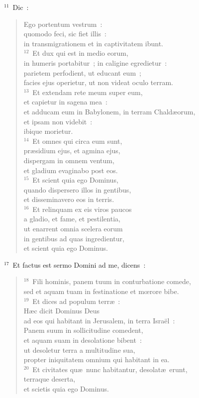 ${}^{11}$~Dic~: \begin{verse}Ego portentum vestrum~:\\ quomodo feci, sic fiet illis~:\\ in transmigrationem et in captivitatem ibunt.\\
${}^{12}$~Et dux qui est in medio eorum,\\ in humeris portabitur~; in caligine egredietur~:\\ parietem perfodient, ut educant eum~;\\ facies ejus operietur, ut non videat oculo terram.\\
${}^{13}$~Et extendam rete meum super eum,\\ et capietur in sagena mea~:\\ et adducam eum in Babylonem, in terram Chald\ae orum,\\ et ipsam non videbit~:\\ ibique morietur.\\
${}^{14}$~Et omnes qui circa eum sunt,\\ pr\ae sidium ejus, et agmina ejus,\\ dispergam in omnem ventum,\\ et gladium evaginabo post eos.\\
${}^{15}$~Et scient quia ego Dominus,\\ quando dispersero illos in gentibus,\\ et disseminavero eos in terris.\\
${}^{16}$~Et relinquam ex eis viros paucos\\ a gladio, et fame, et pestilentia,\\ ut enarrent omnia scelera eorum\\ in gentibus ad quas ingredientur,\\ et scient quia ego Dominus.\end{verse}


${}^{17}$~Et factus est sermo Domini ad me, dicens~:
\begin{verse}${}^{18}$~Fili hominis, panem tuum in conturbatione comede,\\ sed et aquam tuam in festinatione et mœrore bibe.\\
${}^{19}$~Et dices ad populum terr\ae~:\\ H\ae c dicit Dominus Deus\\ ad eos qui habitant in Jerusalem, in terra Isra\"el~:\\ Panem suum in sollicitudine comedent,\\ et aquam suam in desolatione bibent~:\\ ut desoletur terra a multitudine sua,\\ propter iniquitatem omnium qui habitant in ea.\\
${}^{20}$~Et civitates qu\ae\ nunc habitantur, desolat\ae\ erunt,\\ terraque deserta,\\ et scietis quia ego Dominus.\end{verse}



